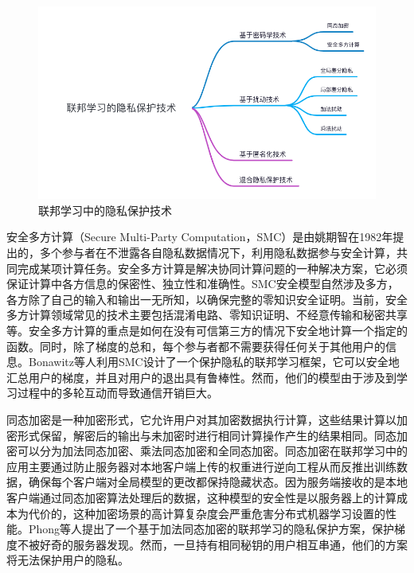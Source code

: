 \begin{figure}[!hbt]
\centering
	\includegraphics[scale=0.5]{fig2/C1/联邦学习隐私保护技术}%
	\caption{联邦学习中的隐私保护技术}
	\label{fig:联邦学习中的隐私保护技术}	
\end{figure}

安全多方计算（Secure Multi-Party Computation，SMC）是由姚期智在1982年提出的，多个参与者在不泄露各自隐私数据情况下，利用隐私数据参与安全计算，共同完成某项计算任务。安全多方计算是解决协同计算问题的一种解决方案，它必须保证计算中各方信息的保密性、独立性和准确性。SMC安全模型自然涉及多方，各方除了自己的输入和输出一无所知，以确保完整的零知识安全证明。当前，安全多方计算领域常见的技术主要包括混淆电路、零知识证明、不经意传输和秘密共享等。安全多方计算的重点是如何在没有可信第三方的情况下安全地计算一个指定的函数。同时，除了梯度的总和，每个参与者都不需要获得任何关于其他用户的信息。Bonawitz等人利用SMC设计了一个保护隐私的联邦学习框架，它可以安全地汇总用户的梯度，并且对用户的退出具有鲁棒性。然而，他们的模型由于涉及到学习过程中的多轮互动而导致通信开销巨大。

同态加密是一种加密形式，它允许用户对其加密数据执行计算，这些结果计算以加密形式保留，解密后的输出与未加密时进行相同计算操作产生的结果相同。同态加密可以分为加法同态加密、乘法同态加密和全同态加密。同态加密在联邦学习中的应用主要通过防止服务器对本地客户端上传的权重进行逆向工程从而反推出训练数据，确保每个客户端对全局模型的更改都保持隐藏状态。因为服务端接收的是本地客户端通过同态加密算法处理后的数据，这种模型的安全性是以服务器上的计算成本为代价的，这种加密场景的高计算复杂度会严重危害分布式机器学习设置的性能。Phong等人提出了一个基于加法同态加密的联邦学习的隐私保护方案，保护梯度不被好奇的服务器发现。然而，一旦持有相同秘钥的用户相互串通，他们的方案将无法保护用户的隐私。

